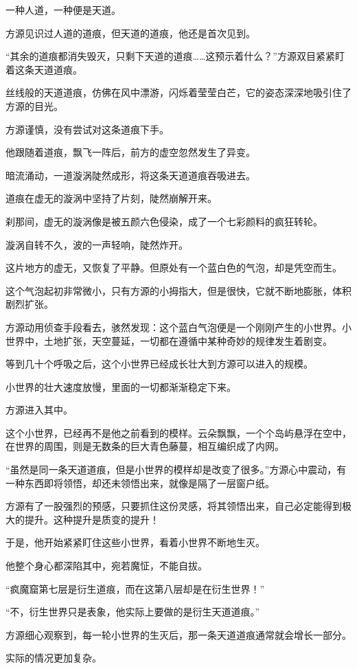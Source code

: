 \begin{this_body}
一种人道，一种便是天道。

方源见识过人道的道痕，但天道的道痕，他还是首次见到。

“其余的道痕都消失毁灭，只剩下天道的道痕……这预示着什么？”方源双目紧紧盯着这条天道道痕。

丝线般的天道道痕，仿佛在风中漂游，闪烁着莹莹白芒，它的姿态深深地吸引住了方源的目光。

方源谨慎，没有尝试对这条道痕下手。

他跟随着道痕，飘飞一阵后，前方的虚空忽然发生了异变。

暗流涌动，一道漩涡陡然成形，将这条天道道痕吞吸进去。

道痕在虚无的漩涡中坚持了片刻，陡然崩解开来。

刹那间，虚无的漩涡像是被五颜六色侵染，成了一个七彩颜料的疯狂转轮。

漩涡自转不久，波的一声轻响，陡然炸开。

这片地方的虚无，又恢复了平静。但原处有一个蓝白色的气泡，却是凭空而生。

这个气泡起初非常微小，只有方源的小拇指大，但是很快，它就不断地膨胀，体积剧烈扩张。

方源动用侦查手段看去，骇然发现：这个蓝白气泡便是一个刚刚产生的小世界。小世界中，土地扩张，天空蔓延，一切都在遵循中某种奇妙的规律发生着剧变。

等到几十个呼吸之后，这个小世界已经成长壮大到方源可以进入的规模。

小世界的壮大速度放慢，里面的一切都渐渐稳定下来。

方源进入其中。

这个小世界，已经再不是他之前看到的模样。云朵飘飘，一个个岛屿悬浮在空中，在世界的周围，则是无数条的巨大青色藤蔓，相互编织成了内网。

“虽然是同一条天道道痕，但是小世界的模样却是改变了很多。”方源心中震动，有一种东西即将领悟，却还未领悟出来，就像是隔了一层窗户纸。

方源有了一股强烈的预感，只要抓住这份灵感，将其领悟出来，自己必定能得到极大的提升。这种提升是质变的提升！

于是，他开始紧紧盯住这些小世界，看着小世界不断地生灭。

他整个身心都深陷其中，宛若魔怔，不能自拔。

“疯魔窟第七层是衍生道痕，而在这第八层却是在衍生世界！”

“不，衍生世界只是表象，他实际上要做的是衍生天道道痕。”

方源细心观察到，每一轮小世界的生灭后，那一条天道道痕通常就会增长一部分。

实际的情况更加复杂。


\end{this_body}
